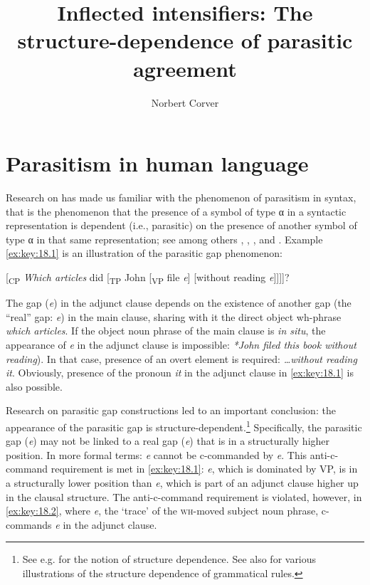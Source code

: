 \documentclass[output=paper]{langsci/langscibook}
\author{Norbert Corver\affiliation{Utrecht Institute of Linguistics-OTS,
Utrecht University}}
\title{Inflected intensifiers: The structure-dependence of parasitic agreement}
\begin{document}
\glsresetall


\section{Parasitism in human language}

Research on  has made us familiar with the phenomenon of
parasitism in syntax, that is the phenomenon that the presence of a symbol of
type α in a syntactic representation is dependent (i.e., parasitic) on the
presence of another symbol of type α in that same representation; see among
others \textcite{Ross1967}, \textcite{Taraldsen1981}, \textcite{Chomsky1982},
and \textcite{Engdahl:1983}. Example \eqref{ex:key:18.1} is an illustration of the
parasitic gap phenomenon:

\ea%
    \label{ex:key:18.1}
    {}[\textsubscript{CP} \emph{Which articles} did [\textsubscript{TP} John
    [\textsubscript{VP} file \emph{e}\textsubscript{\Rg{}}] [without
    reading \emph{e}\textsubscript{\Pg{}}]]]]?
\z

The gap (\emph{e}\textsubscript{\Pg{}}) in the adjunct clause depends on the
existence of another gap (the \enquote{real} gap: \emph{e}\textsubscript{\Rg{}}) in the
main clause, sharing with it the direct object wh-phrase \emph{which articles}.
If the object noun phrase of the main clause is \emph{in situ}, the appearance
of \emph{e}\textsubscript{\Pg{}} in the adjunct clause is impossible:
\emph{*John filed this book without reading}). In that case, presence of an
overt element is required: \emph{\dots{}without reading it}. Obviously,
presence of the pronoun \emph{it} in the adjunct clause in \eqref{ex:key:18.1} is
also possible.

Research on parasitic gap constructions led to an important conclusion: the
appearance of the parasitic gap is structure-dependent.\footnote{See e.g.
    \citet{Chomsky1975} for the notion of structure dependence. See also
    \citet{EveraertEtAl2015} for various illustrations of the structure
dependence of grammatical rules.} Specifically, the parasitic gap
(\emph{e}\textsubscript{\Pg{}}) may not be linked to a real gap
(\emph{e}\textsubscript{\Rg{}}) that is in a structurally higher position.  In
more formal terms: \emph{e}\textsubscript{\Pg{}} cannot be c-commanded by
\emph{e}\textsubscript{\Rg{}}. This anti-c-command requirement is met in
\eqref{ex:key:18.1}: \emph{e}\textsubscript{\Rg{}}, which is dominated by VP, is in
a structurally lower position than \emph{e}\textsubscript{\Pg{}}, which is part
of an adjunct clause higher up in the clausal structure. The anti-c-command
requirement is violated, however, in \eqref{ex:key:18.2}, where
\emph{e}\textsubscript{\Rg{}}, the \enquote*{trace} of the \textsc{wh}-moved subject
noun phrase, c-commands \emph{e}\textsubscript{\Pg{}} in the adjunct clause.
\end{document}
